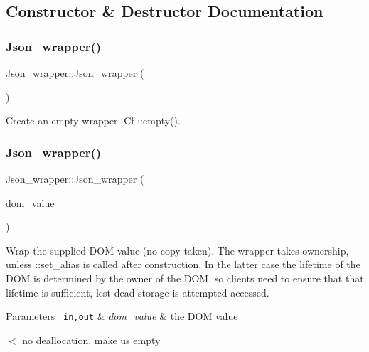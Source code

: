 \subsection{Constructor \& Destructor Documentation}
\mbox{\label{classJson__wrapper_a8b257a35677b04c082c2b44399c03e47}} 
\subsubsection{\texorpdfstring{Json\+\_\+wrapper()}{Json\_wrapper()}\hspace{0.1cm}{\footnotesize\ttfamily [1/4]}}
{\footnotesize\ttfamily Json\+\_\+wrapper\+::\+Json\+\_\+wrapper (\begin{DoxyParamCaption}{ }\end{DoxyParamCaption})\hspace{0.3cm}{\ttfamily [inline]}}

Create an empty wrapper. Cf \+::empty(). \mbox{\label{classJson__wrapper_ae04c087ae4f85772f0458562ef6e062c}} 
\subsubsection{\texorpdfstring{Json\+\_\+wrapper()}{Json\_wrapper()}\hspace{0.1cm}{\footnotesize\ttfamily [2/4]}}
{\footnotesize\ttfamily Json\+\_\+wrapper\+::\+Json\+\_\+wrapper (\begin{DoxyParamCaption}\item[{\mbox{\hyperlink{classJson__dom}{Json\+\_\+dom}} $\ast$}]{dom\+\_\+value }\end{DoxyParamCaption})\hspace{0.3cm}{\ttfamily [explicit]}}

Wrap the supplied D\+OM value (no copy taken). The wrapper takes ownership, unless \+::set\+\_\+alias is called after construction. In the latter case the lifetime of the D\+OM is determined by the owner of the D\+OM, so clients need to ensure that that lifetime is sufficient, lest dead storage is attempted accessed.


\begin{DoxyParams}[1]{Parameters}
\mbox{\texttt{ in,out}}  & {\em dom\+\_\+value} & the D\+OM value \\
\hline
\end{DoxyParams}
$<$ no deallocation, make us empty \mbox{\label{classJson__wrapper_a1aaa204561e201d01e0827dbf1f1350e}} 
